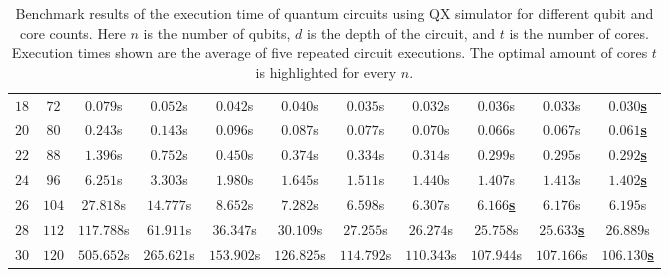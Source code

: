 \begin{table}[ht]
\begin{adjustwidth}{-0.35cm}{-0.35cm}
{\begin{tabular}{ccccccccccc}
            $18$ & $72$ & $0.079$s & $0.052$s & $0.042$s & $0.040$s & $0.035$s & $0.032$s & $0.036$s & $0.033$s & \underline{$\mathbf{0.030}$\textbf{s}} \\
            $20$ & $80$ & $0.243$s & $0.143$s & $0.096$s & $0.087$s & $0.077$s & $0.070$s & $0.066$s & $0.067$s & \underline{$\mathbf{0.061}$\textbf{s}} \\
            $22$ & $88$ & $1.396$s & $0.752$s & $0.450$s & $0.374$s & $0.334$s & $0.314$s & $0.299$s & $0.295$s & \underline{$\mathbf{0.292}$\textbf{s}} \\
            $24$ & $96$ & $6.251$s & $3.303$s & $1.980$s & $1.645$s & $1.511$s & $1.440$s & $1.407$s & $1.413$s & \underline{$\mathbf{1.402}$\textbf{s}} \\
            $26$ & $104$ & $27.818$s & $14.777$s & $8.652$s & $7.282$s & $6.598$s & $6.307$s & \underline{$\mathbf{6.166}$\textbf{s}} & $6.176$s & $6.195$s \\
            $28$ & $112$ & $117.788$s & $61.911$s & $36.347$s & $30.109$s & $27.255$s & $26.274$s & $25.758$s & \underline{$\mathbf{25.633}$\textbf{s}} & $26.889$s \\
            $30$ & $120$ & $505.652$s & $265.621$s & $153.902$s & $126.825$s & $114.792$s & $110.343$s & $107.944$s & $107.166$s & \underline{$\mathbf{106.130}$\textbf{s}} \\
        \end{tabular}
    }
    \end{adjustwidth}
    \caption[Benchmark results of the execution time of quantum circuits using QX simulator for different qubit and core counts.]{
        Benchmark results of the execution time of quantum circuits using QX simulator for different qubit and core counts.
        Here $n$ is the number of qubits, $d$ is the depth of the circuit, and $t$ is the number of cores.
        Execution times shown are the average of five repeated circuit executions.
        The optimal amount of cores $t$ is highlighted for every $n$.
    }
\end{table}
